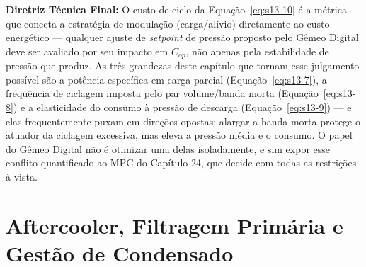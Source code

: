 \documentclass[12pt,a4paper]{article}
\numberwithin{equation}{section}
\numberwithin{table}{section}
\numberwithin{figure}{section}
\begin{document}
{	\textbf{Diretriz Técnica Final:} O custo de ciclo da Equação~\eqref{eq:s13-10} é a métrica que conecta a estratégia de modulação (carga/alívio) diretamente ao custo energético — qualquer ajuste de \textit{setpoint} de pressão proposto pelo Gêmeo Digital deve ser avaliado por seu impacto em $C_{op}$, não apenas pela estabilidade de pressão que produz. As três grandezas deste capítulo que tornam esse julgamento possível são a potência específica em carga parcial (Equação~\eqref{eq:s13-7}), a frequência de ciclagem imposta pelo par volume/banda morta (Equação~\eqref{eq:s13-8}) e a elasticidade do consumo à pressão de descarga (Equação~\eqref{eq:s13-9}) — e elas frequentemente puxam em direções opostas: alargar a banda morta protege o atuador da ciclagem excessiva, mas eleva a pressão média e o consumo. O papel do Gêmeo Digital não é otimizar uma delas isoladamente, e sim expor esse conflito quantificado ao MPC do Capítulo 24, que decide com todas as restrições à vista.

	\clearpage
	\section{Aftercooler, Filtragem Primária e Gestão de Condensado}

}
\end{document}
